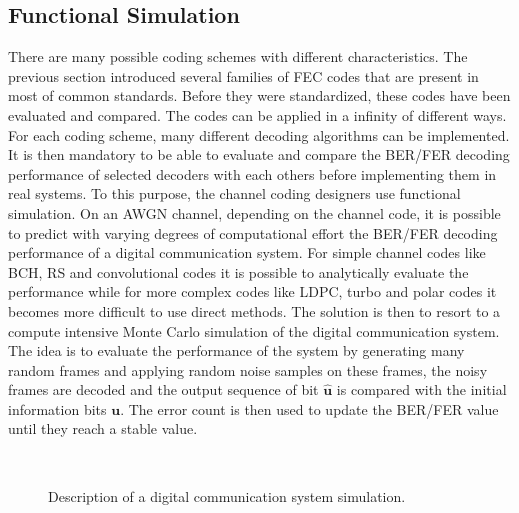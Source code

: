 \subsection{Functional Simulation}
\label{sec:ctx_simulation}

There are many possible coding schemes with different characteristics. The
previous section introduced several families of FEC codes that are present in
most of common standards. Before they were standardized, these codes have been
evaluated and compared. The codes can be applied in a infinity of different
ways. For each coding scheme, many different decoding algorithms can be
implemented. It is then mandatory to be able to evaluate and compare the BER/FER
decoding performance of selected decoders with each others before implementing
them in real systems. To this purpose, the channel coding designers use
functional simulation. On an AWGN channel, depending on the channel code, it is
possible to predict with varying degrees of computational effort the BER/FER
decoding performance of a digital communication system. For simple channel codes
like BCH, RS and convolutional codes it is possible to analytically evaluate the
performance while for more complex codes like LDPC, turbo and polar codes it
becomes more difficult to use direct methods. The solution is then to resort to
a compute intensive Monte Carlo simulation of the digital communication system.
The idea is to evaluate the performance of the system by generating many random
frames and applying random noise samples on these frames, the noisy frames are
decoded and the output sequence of bit $\bm{\hat{u}}$ is compared with the
initial information bits $\bm{u}$. The error count is then used to update the
BER/FER value until they reach a stable value.

\begin{figure}[htp]
  \centering
  \\
  \caption{Description of a digital communication system simulation.}
  \label{fig:ctx_simu_com_chain}
\end{figure}


